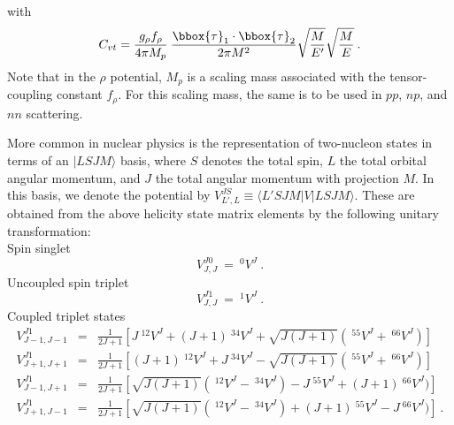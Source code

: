 with
\begin{equation}
C_{vt}= \frac{g_{\rho}f_{\rho}}{4\pi M_p}\: \frac{
\bbox{\tau}_1 \cdot \bbox{\tau}_2
}{2\pi M^2}
\sqrt{\frac{M}{E'}}
\sqrt{\frac{M}{E}}
\: .
\label{32.17}
\end{equation}
Note that in the $\rho$ potential, $M_p$ is a scaling mass associated
with the tensor-coupling constant $f_\rho$. For this scaling
mass, the same is to be used in
$pp$, $np$, and $nn$ scattering.


More common in nuclear physics is the representation of 
two-nucleon states
in terms of an 
$|LSJM\rangle$ basis, 
where $S$ denotes the total spin, $L$ the total orbital 
angular momentum, and $J$ the total angular momentum with 
projection $M$. 
In this basis, we denote the potential by
${V}^{JS}_{L',L}\equiv \langle L'SJM|{V}|LSJM\rangle$.
  These are obtained from the above helicity state matrix 
elements by the following unitary transformation:\\
{ Spin singlet}
\begin{equation}
{V}^{J0}_{J,J}\: =\: ^0{V}^J
\: .
\label{22.10V}
\end{equation}
{ Uncoupled spin triplet} 
\begin{equation}
{V}^{J1}_{J,J}\: =\: ^1{V}^J
\: .
\label{22.11V}
\end{equation}
{ Coupled triplet states}
\begin{eqnarray}
{V}^{J1}_{J-1,J-1} & = & \frac{1}{2J+1} \left[J\: ^{12}{V}^J 
+ (J+1)\: ^{34}{V}^J
+ \sqrt{J(J+1)}(\: ^{55}{V}^J+\: ^{66}{V}^J)\right]
\nonumber \\
{V}^{J1}_{J+1,J+1} & = & \frac{1}{2J+1} \left[(J+1)\: ^{12}{V}^J 
+ J\: ^{34}{V}^J
- \sqrt{J(J+1)}(\: ^{55}{V}^J+\: ^{66}{V}^J)\right]
\nonumber \\
{V}^{J1}_{J-1,J+1} & = & \frac{1}{2J+1} \left[\sqrt{J(J+1)}
(\: ^{12}{V}^J -\: ^{34}{V}^J)
- J\: ^{55}{V}^J + (J+1)\: ^{66}{V}^J)\right]
\nonumber  \\
{V}^{J1}_{J+1,J-1} & = & \frac{1}{2J+1} \left[\sqrt{J(J+1)}
(\: ^{12}{V}^J -\: ^{34}{V}^J)
+ (J+1)\: ^{55}{V}^J - J\: ^{66}{V}^J)\right]
\: .
\label{22.12V} 
\end{eqnarray}

